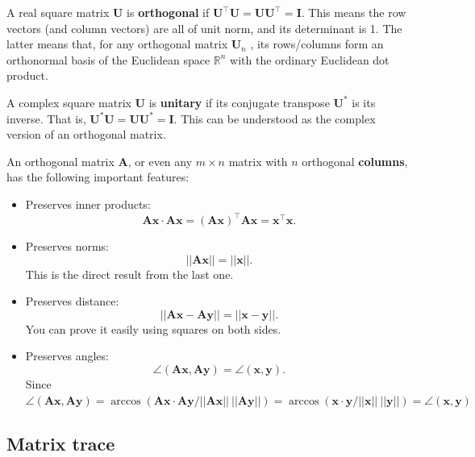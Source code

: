 \documentclass[12pt]{article}
\numberwithin{equation}{section}
\begin{document}
A real square matrix $\mathbf{U}$ is \textbf{orthogonal} if $\mathbf{U}^\top\mathbf{U} = \mathbf{U} \mathbf{U}^\top = \mathbf{I}$. This means the row vectors (and column vectors) are all of unit norm, and its determinant is 1. The latter means that, for any orthogonal matrix $\mathbf{U}_n$ , its rows/columns form an orthonormal basis of the Euclidean space $\mathbb{R}^n$ with the ordinary Euclidean dot product.

A complex square matrix $\mathbf{U}$ is \textbf{unitary} if its conjugate transpose $\mathbf{U}^*$ is its inverse. That is, $\mathbf{U}^* \mathbf{U} = \mathbf{U} \mathbf{U}^* = \mathbf{I}$. This can be understood as the complex version of an orthogonal matrix.

An orthogonal matrix $\mathbf{A}$, or even any $m \times n$ matrix with $n$ orthogonal \textbf{columns}, has the following important features:
\begin{itemize}
\item Preserves inner products:
\begin{equation}
\mathbf{Ax \cdot Ax} = \mathbf{(Ax)^\top Ax} = \mathbf{x^\top x}.
\label{eq:orthogonal:1}
\end{equation}
\item Preserves norms:
\begin{equation}
||\mathbf{Ax}|| = ||\mathbf{x}||.
\label{eq:orthogonal:2}
\end{equation}
This is the direct result from the last one.
\item Preserves distance:
\begin{equation}
||\mathbf{Ax - Ay}|| = ||\mathbf{x - y}||.
\label{eq:orthogonal:3}
\end{equation}
You can prove it easily using squares on both sides.
\item Preserves angles:
\begin{equation}
\angle(\mathbf{Ax,Ay}) = \angle(\mathbf{x,y}).
\label{eq:orthogonal:4}
\end{equation}
Since $\angle(\mathbf{Ax,Ay}) = \arccos(\mathbf{Ax \cdot Ay} /||\mathbf{Ax}|| \ ||\mathbf{Ay}||) = \arccos(\mathbf{x \cdot y} /||\mathbf{x}|| \ ||\mathbf{y}||) = \angle(\mathbf{x,y})$
\end{itemize}

\subsection{Matrix trace}
\label{sec:trace}
\end{document}
